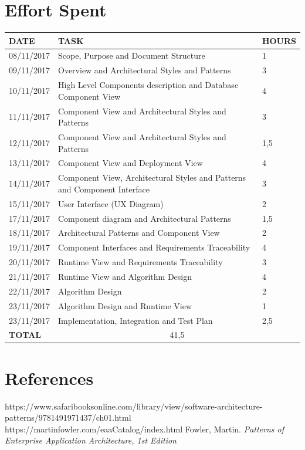 \documentclass[12pt]{article}
\begin{document}
\section{Effort Spent}

\begin{center}
\begin{tabular}{ |p{}|p{}|p{}| } 
 \hline
 \textbf{DATE} & \textbf{TASK} & \textbf{HOURS} \\ 
  \hline
 08/11/2017 &  Scope, Purpose and Document Structure & 1 \\ 
  \hline
 09/11/2017 & Overview and Architectural Styles and Patterns & 3 \\
  \hline
  10/11/2017 & High Level Components description and Database Component View & 4 \\ 
  \hline
  11/11/2017 & Component View and Architectural Styles and Patterns & 3 \\ 
  \hline
  12/11/2017 & Component View and Architectural Styles and Patterns & 1,5 \\ 
  \hline
  13/11/2017 & Component View and Deployment View & 4 \\ 
  \hline
  14/11/2017 & Component View, Architectural Styles and Patterns and Component Interface & 3 \\ 
  \hline
  15/11/2017 & User Interface (UX Diagram) & 2 \\ 
  \hline
  17/11/2017 & Component diagram and Architectural Patterns & 1,5 \\
  \hline
  18/11/2017 & Architectural Patterns and Component View & 2 \\
  \hline
  19/11/2017 & Component Interfaces and Requirements Traceability & 4 \\
  \hline
  20/11/2017 & Runtime View and Requirements Traceability & 3 \\
  \hline
  21/11/2017 & Runtime View and Algorithm Design & 4 \\
  \hline
  22/11/2017 & Algorithm Design & 2 \\
  \hline
  23/11/2017 & Algorithm Design and Runtime View & 1 \\
  \hline
  23/11/2017 & Implementation, Integration and Test Plan & 2,5 \\
  \hline
  \textbf{TOTAL} & \multicolumn{2}{c|}{41,5} \\ 
  \hline
\end{tabular}
\end{center}

\section{References}

\begin{thebibliography}{9}
https://www.safaribooksonline.com/library/view/software-architecture-patterns/9781491971437/ch01.html
https://martinfowler.com/eaaCatalog/index.html
Fowler, Martin. \textit{Patterns of Enterprise Application Architecture, 1st Edition}

\end{thebibliography}
\end{document}
